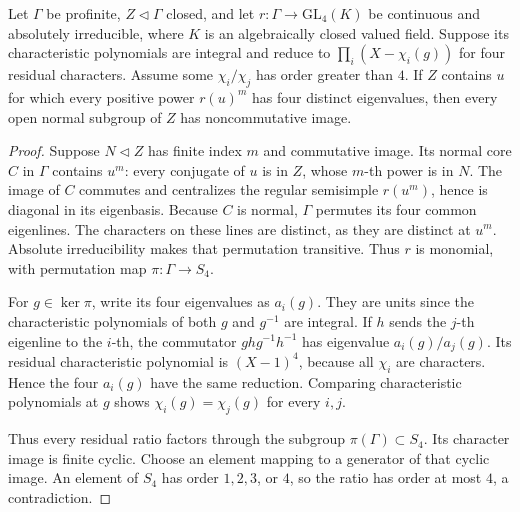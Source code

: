 \begin{srlemma}
\label{lem:sr-four-noncommutative}
Let \(\Gamma\) be profinite, \(Z\triangleleft\Gamma\) closed,
and let \(r:\Gamma\to\mathrm{GL}_4(K)\) be continuous and
absolutely irreducible, where \(K\) is an algebraically closed
valued field. Suppose its characteristic polynomials are
integral and reduce to
\(\prod_i(X-\chi_i(g))\) for four residual characters.
Assume some \(\chi_i/\chi_j\) has order greater than \(4\).
If \(Z\) contains \(u\) for which every positive power \(r(u)^m\)
has four distinct eigenvalues, then every open normal subgroup
of \(Z\) has noncommutative image.
\end{srlemma}
\begin{proof}
Suppose \(N\triangleleft Z\) has finite index \(m\) and
commutative image. Its normal core \(C\) in \(\Gamma\)
contains \(u^m\): every conjugate of \(u\) is in \(Z\), whose
\(m\)-th power is in \(N\).
The image of \(C\) commutes and centralizes the regular
semisimple \(r(u^m)\), hence is diagonal in its eigenbasis.
Because \(C\) is normal, \(\Gamma\) permutes its four common
eigenlines. The characters on these lines are distinct, as
they are distinct at \(u^m\).
Absolute irreducibility makes that permutation transitive.
Thus \(r\) is monomial, with permutation map
\(\pi:\Gamma\to S_4\).

For \(g\in\ker\pi\), write its four eigenvalues as \(a_i(g)\).
They are units since the characteristic polynomials of both
\(g\) and \(g^{-1}\) are integral.
If \(h\) sends the \(j\)-th eigenline to the \(i\)-th, the
commutator \(ghg^{-1}h^{-1}\) has eigenvalue
\(a_i(g)/a_j(g)\).
Its residual characteristic polynomial is \((X-1)^4\),
because all \(\chi_i\) are characters.
Hence the four \(a_i(g)\) have the same reduction.
Comparing characteristic polynomials at \(g\) shows
\(\chi_i(g)=\chi_j(g)\) for every \(i,j\).

Thus every residual ratio factors through the subgroup
\(\pi(\Gamma)\subset S_4\).
Its character image is finite cyclic.
Choose an element mapping to a generator of that cyclic image.
An element of \(S_4\) has order \(1,2,3\), or \(4\), so the
ratio has order at most \(4\), a contradiction.
\end{proof}

